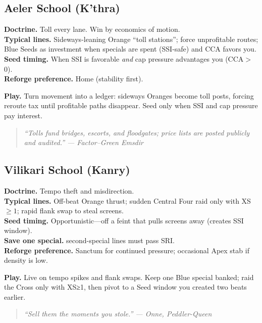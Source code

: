 \documentclass[11pt]{article}
\providecommand{\playdesc}[1]{\par\smallskip\noindent\small\textbf{Play.} #1\par}
\begin{document}
\subsection*{Aeler School (K’thra)}
\textbf{Doctrine.} Toll every lane. Win by economics of motion.\\
\textbf{Typical lines.} Sideways-leaning Orange ``toll stations''; force unprofitable routes; Blue Seeds as investment when specials are spent (SSI-safe) and CCA favors you.\\
\textbf{Seed timing.} When SSI is favorable \emph{and} cap pressure advantages you (CCA$>$0).\\
\textbf{Reforge preference.} Home (stability first).
\playdesc{Turn movement into a ledger: sideways Oranges become toll posts, forcing reroute tax until profitable paths disappear. Seed only when SSI and cap pressure pay interest.}
\begin{quote}\small\itshape
“Tolls fund bridges, escorts, and floodgates; price lists are posted publicly and audited.” — Factor–Green Emsdir
\end{quote}

\subsection*{Vilikari School (Kanry)}
\textbf{Doctrine.} Tempo theft and misdirection.\\
\textbf{Typical lines.} Off-beat Orange thrust; sudden Central Four raid only with XS$\ge1$; rapid flank swap to steal screens.\\
\textbf{Seed timing.} Opportunistic—off a feint that pulls screens away (creates SSI window).\\
\textbf{Save one special.} second-special lines must pass SRI. \\
\textbf{Reforge preference.} Sanctum for continued pressure; occasional Apex stab if density is low.
\playdesc{Live on tempo spikes and flank swaps. Keep one Blue special banked; raid the Cross only with XS≥1, then pivot to a Seed window you created two beats earlier.}
\begin{quote}\small\itshape
“Sell them the moments you stole.” — Onne, Peddler-Queen
\end{quote}

\end{document}
